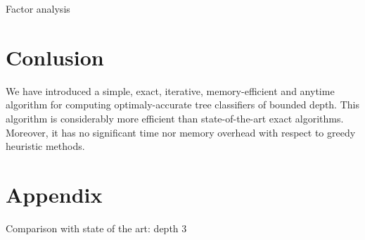 \documentclass{llncs}
\begin{document}
\begin{table}[htbp]
\begin{center}
\begin{footnotesize}
\tabcolsep=2pt

\end{footnotesize}
\end{center}
\caption{\label{tab:factor} Factor analysis}
\end{table}

% 


\section{Conlusion}

We have introduced a simple, exact, iterative, memory-efficient and anytime algorithm for computing optimaly-accurate tree classifiers of bounded depth.
This algorithm is considerably more efficient than state-of-the-art exact algorithms. Moreover, it has no significant time nor memory overhead with respect to greedy heuristic methods.







\clearpage


\section*{Appendix}

\renewcommand{\arraystretch}{.955}

\begin{table}[htbp]%
\begin{center}%
\begin{scriptsize}%
\tabcolsep=2pt%
%
\end{scriptsize}%
\end{center}%
\caption{\label{tab:all3} Comparison with state of the art: depth 3}%
\end{table}%
\end{document}
